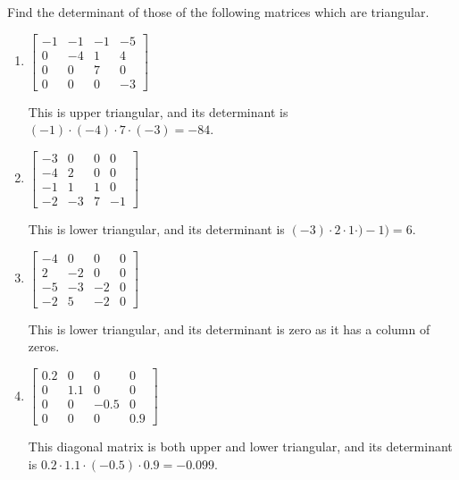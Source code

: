 \begin{example} \label{eg:}
Find the determinant of those of the following matrices which are triangular.
\begin{enumerate}
\item \(\begin{bmatrix}-1&-1&-1&-5
\\0&-4&1&4
\\0&0&7&0
\\0&0&0&-3 \end{bmatrix}\)
\begin{solution} 
This is upper triangular, and its determinant is \((-1)\cdot(-4)\cdot7\cdot(-3)=-84\). 
\end{solution}

\item \(\begin{bmatrix}-3&0&0&0
\\-4&2&0&0
\\-1&1&1&0
\\-2&-3&7&-1\end{bmatrix}\)
\begin{solution} 
This is lower triangular, and its determinant is \((-3)\cdot2\cdot1\cdot)-1)=6\). 
\end{solution}

\item \(\begin{bmatrix}-4&0&0&0
\\2&-2&0&0
\\-5&-3&-2&0
\\-2&5&-2&0\end{bmatrix}\)
\begin{solution} 
This is lower triangular, and its determinant is zero as it has a column of zeros. 
\end{solution}

\item \(\begin{bmatrix}0.2&0&0&0
\\0&1.1&0&0
\\0&0&-0.5&0
\\0&0&0&0.9\end{bmatrix}\)
\begin{solution} 
This diagonal matrix is both upper and lower triangular, and its determinant is \(0.2\cdot1.1\cdot(-0.5)\cdot0.9=-0.099\). 
\end{solution}


\end{enumerate}
\end{example}
